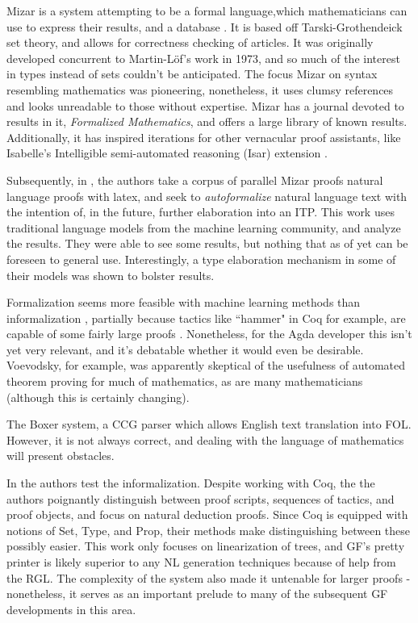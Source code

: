 Mizar is a system attempting to be a formal language,which mathematicians can
use to express their results, and a database \cite{rudnicki1992overview}. It is
based off Tarski-Grothendeick set theory, and allows for correctness checking of
articles. It was originally developed concurrent to Martin-Löf's work in 1973,
and so much of the interest in types instead of sets couldn't be anticipated.
The focus Mizar on syntax resembling mathematics was pioneering, nonetheless, it
uses clumsy references and looks unreadable to those without expertise. Mizar
has a journal devoted to results in it, \emph{Formalized Mathematics}, and
offers a large library of known results. Additionally, it has inspired
iterations for other vernacular proof assistants, like Isabelle's Intelligible semi-automated
reasoning (Isar) extension \cite{wenzel2004isabelle}.

Subsequently, in \cite{mlTrans}, the authors take a corpus of parallel Mizar proofs natural
language proofs with latex, and seek to \emph{autoformalize} natural language
text with the intention of, in the future, further elaboration into an ITP.
This work uses traditional language models from the machine learning community, and analyze
the results. They were able to see some results, but nothing that as of yet can
be foreseen to general use.  Interestingly, a type elaboration mechanism in some
of their models was shown to bolster results.

Formalization seems more feasible with machine learning methods than
informalization , partially because tactics like ``hammer" in Coq for example,
are capable of some fairly large proofs \cite{czajka2018hammer} . Nonetheless,
for the Agda developer this isn't yet very relevant, and it's debatable whether
it would even be desirable. Voevodsky, for example, was apparently skeptical of
the usefulness of automated theorem proving for much of mathematics, as are many
mathematicians (although this is certainly changing).

The Boxer system, a CCG parser \cite{bos-etal-2004-wide} which allows English
text translation into FOL. However, it is not always correct, and dealing with
the language of mathematics will present obstacles. 

In \cite{proofFrom} the authors test the informalization. Despite working with
Coq, the the authors poignantly distinguish between proof scripts, sequences of
tactics, and proof objects, and focus on natural deduction proofs. Since Coq is
equipped with notions of Set, Type, and Prop, their methods make distinguishing
between these possibly easier. This work only focuses on linearization of trees,
and GF's pretty printer is likely superior to any NL generation techniques
because of help from the RGL. The complexity of the system also made it
untenable for larger proofs - nonetheless, it serves as an important prelude to
many of the subsequent GF developments in this area.

